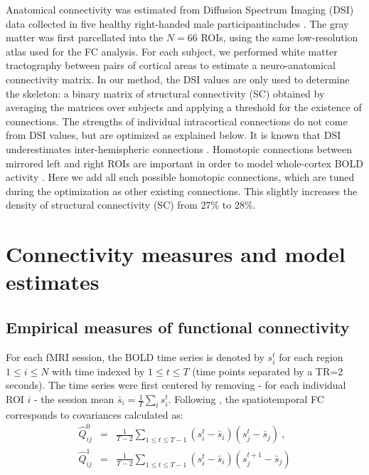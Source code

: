 \documentclass{article}
\begin{document}
Anatomical connectivity was estimated from Diffusion Spectrum Imaging (DSI) data collected in five healthy right-handed male participantincludes \cite{Hagmann_PB_2008}. The gray matter was first parcellated into the $N = 66$ ROIs, using the same low-resolution atlas used for the FC analysis. For each subject, we performed white matter tractography between pairs of cortical areas to estimate a neuro-anatomical connectivity matrix. In our method, the DSI values are only used to determine the skeleton: a binary matrix of structural connectivity (SC) obtained by averaging the matrices over subjects and applying a threshold for the existence of connections. The strengths of individual intracortical connections do not come from DSI values, but are optimized as explained below.
It is known that DSI underestimates inter-hemispheric connections \cite{Hagmann_PB_2008}. Homotopic connections between mirrored left and right ROIs are important in order to model whole-cortex BOLD activity \cite{Messe_PCB_2014}. Here we add all such possible homotopic connections, which are tuned during the optimization as other existing connections. This slightly increases the density of structural connectivity (SC) from 27\% to 28\%.


\section{Connectivity measures and model estimates}



\subsection{Empirical measures of functional connectivity}

For each fMRI session, the BOLD time series is denoted by $s_i^t$ for each region $1 \leq i \leq N$ with time indexed by $1 \leq t \leq T$ (time points separated by a TR=2 seconds). 
The time series were first centered by removing - for each individual ROI $i$ - the session mean $\bar{s}_i = \frac{1}{T} \sum_t s_i^t$. 
Following \cite{Gilson_PCB_2016}, the spatiotemporal FC corresponds to covariances calculated as:
\begin{eqnarray} \label{eq_emp_cov}
\widehat{Q}^0_{ij} & = & \frac{1}{T-2} \sum_{1 \leq t \leq T-1} (s_i^t - \bar{s}_i) (s_j^t - \bar{s}_j)
\ ,
\\
\widehat{Q}^1_{ij} & = & \frac{1}{T-2} \sum_{1 \leq t \leq T-1} (s_i^t - \bar{s}_i) (s_j^{t+1} - \bar{s}_j)
\nonumber
\end{eqnarray}
\end{document}
